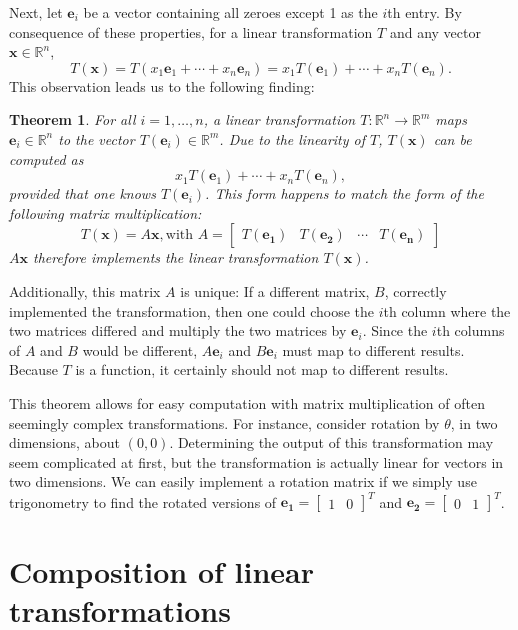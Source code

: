 \documentclass[draft,12pt]{report}
\newtheorem{theorem}{Theorem}
\renewcommand{\vec}[1]{\mathbf{#1}}
\begin{document}
Next, let $\vec{e}_i$ be a vector containing all zeroes except 1 as the $i$th entry. By consequence of these properties, for a linear transformation $T$ and any vector $\vec{x} \in \mathbb R^n$,
\[ T(\vec{x}) = T(x_1\vec{e}_1 + \cdots + x_n\vec{e}_n) = x_1T(\vec{e}_1) + \cdots + x_nT(\vec{e}_n). \]
This observation leads us to the following finding:
\begin{theorem}
    For all $i = 1, \ldots, n$, a \emph{linear} transformation $T : \mathbb R^n \rightarrow \mathbb R^m$ maps $\vec{e}_i \in \mathbb R^n$ to the vector $T(\vec{e}_i) \in \mathbb R^m$. Due to the linearity of $T$, $T(\vec{x})$ can be computed as
    \[ x_1 T(\vec{e}_1) + \cdots + x_n T(\vec{e}_n), \]
    provided that one knows $T(\vec{e}_i)$. This form happens to match the form of the following matrix multiplication:
    \[ T(\vec{x}) = A\vec{x}, \text{with } A = \begin{bmatrix} T(\vec{e_1}) & T(\vec{e_2}) & \cdots & T(\vec{e_n}) \end{bmatrix} \]
    $A\vec{x}$ therefore implements the linear transformation $T(\vec{x})$.
\end{theorem}
\noindent
Additionally, this matrix $A$ is unique: If a different matrix, $B$, correctly implemented the transformation, then one could choose the $i$th column where the two matrices differed and multiply the two matrices by $\vec{e}_i$. Since the $i$th columns of $A$ and $B$ would be different, $A\vec{e}_i$ and $B\vec{e}_i$ must map to different results. Because $T$ is a function, it certainly should not map to different results.

This theorem allows for easy computation with matrix multiplication of often seemingly complex transformations. For instance, consider rotation by $\theta$, in two dimensions, about $(0, 0)$. Determining the output of this transformation may seem complicated at first, but the transformation is actually linear for vectors in two dimensions. We can easily implement a rotation matrix if we simply use trigonometry to find the rotated versions of $\vec{e_1} = \begin{bmatrix} 1 & 0 \end{bmatrix}^T$ and $\vec{e_2} = \begin{bmatrix} 0 & 1 \end{bmatrix}^T$.

\section{Composition of linear transformations}
\end{document}
